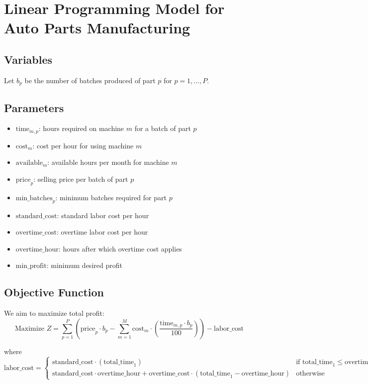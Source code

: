 \documentclass{article}
\begin{document}
\section*{Linear Programming Model for Auto Parts Manufacturing}

\subsection*{Variables}
Let \( b_{p} \) be the number of batches produced of part \( p \) for \( p = 1, \ldots, P \).

\subsection*{Parameters}
\begin{itemize}
    \item \( \text{time}_{m,p} \): hours required on machine \( m \) for a batch of part \( p \)
    \item \( \text{cost}_{m} \): cost per hour for using machine \( m \)
    \item \( \text{available}_{m} \): available hours per month for machine \( m \)
    \item \( \text{price}_{p} \): selling price per batch of part \( p \)
    \item \( \text{min\_batches}_{p} \): minimum batches required for part \( p \)
    \item \( \text{standard\_cost} \): standard labor cost per hour
    \item \( \text{overtime\_cost} \): overtime labor cost per hour
    \item \( \text{overtime\_hour} \): hours after which overtime cost applies
    \item \( \text{min\_profit} \): minimum desired profit
\end{itemize}

\subsection*{Objective Function}
We aim to maximize total profit:
\[
\text{Maximize } Z = \sum_{p=1}^{P} \left( \text{price}_{p} \cdot b_{p} - \sum_{m=1}^{M} \text{cost}_{m} \cdot \left( \frac{\text{time}_{m,p} \cdot b_{p}}{100} \right) \right) - \text{labor\_cost}
\]

where 
\[
\text{labor\_cost} = 
\begin{cases}
\text{standard\_cost} \cdot (\text{total\_time}_1) & \text{if } \text{total\_time}_1 \leq \text{overtime\_hour} \\
\text{standard\_cost} \cdot \text{overtime\_hour} + \text{overtime\_cost} \cdot (\text{total\_time}_1 - \text{overtime\_hour}) & \text{otherwise}
\end{cases}
\]
\end{document}
